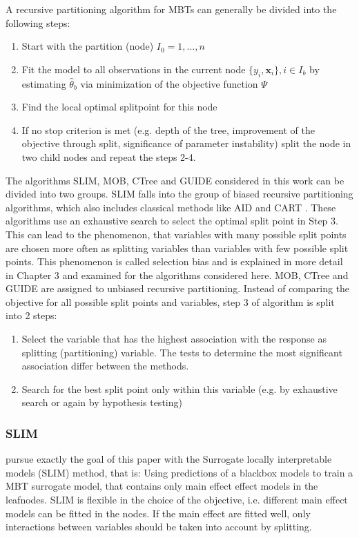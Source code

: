 A recursive partitioning algorithm for MBTs can generally be divided into the following steps:
\begin{enumerate}
    \item Start with the partition (node) $I_0 = 1,...,n$
    \item Fit the model to all observations in the current node $\{y_{i}, \mathbf{x}_{i}\}, i \in I_b$ by estimating $\hat{\theta}_b$ via minimization of the objective function $\Psi$
    \item Find the local optimal splitpoint for this node 
    \item If no stop criterion is met (e.g. depth of the tree, improvement of the objective through split, significance of parameter instability) split the node in two child nodes and repeat the steps 2-4.
\end{enumerate}


The algorithms SLIM, MOB, CTree and GUIDE considered in this work can be divided into two groups. SLIM falls into the group of biased recursive partitioning algorithms, which also includes classical methods like AID \citep{Morgan.1963} and CART \citep{Breiman.1984}. These algorithms use an exhaustive search to select the optimal split point in Step 3. This can lead to the phenomenon, that variables with many possible split points are chosen more often as splitting variables than variables with few possible split points. This phenomenon is called selection bias and is explained in more detail in Chapter 3 and examined for the algorithms considered here.
MOB, CTree and GUIDE are assigned to unbiased recursive partitioning. Instead of comparing the objective for all possible split points and variables, step 3 of algorithm is split into 2 steps:

\begin{enumerate}
    \item Select the variable that has the highest association with the response as splitting (partitioning) variable. The tests to determine the most significant association differ between the methods.
    \item Search for the best split point only within this variable (e.g. by exhaustive search or again by hypothesis testing)
\end{enumerate}

\citep{Schlosser.2019}



\subsubsection{SLIM}
\citep{Hu.2020} pursue exactly the goal of this paper with the Surrogate locally interpretable models (SLIM) method, that is: Using predictions of a blackbox models to train a MBT surrogate model, that contains only main effect effect models in the leafnodes. SLIM is flexible in the choice of the objective, i.e. different main effect models can be fitted in the nodes. If the main effect are fitted well, only interactions between variables should be taken into account by splitting. 

